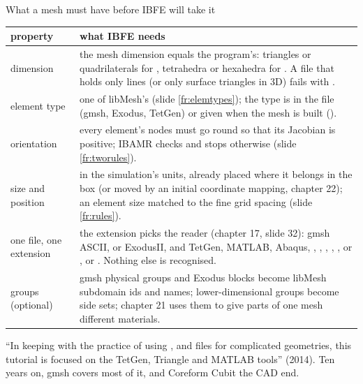 \documentclass[aspectratio=169,11pt]{beamer}
\begin{document}
\begin{frame}{What a mesh must have before IBFE will take it}
\label{fr:musthave}
\scriptsize
\vspace{-6pt}
\begin{tabular}{@{}L{0.20\textwidth}L{0.72\textwidth}@{}}
\toprule
property & what IBFE needs \\
\midrule
dimension & the mesh dimension equals the program's: triangles or quadrilaterals for , tetrahedra or hexahedra for . A file that holds only lines (or only surface triangles in 3D) fails with . \\
element type & one of libMesh's (slide \ref{fr:elemtypes}); the type is in the file (gmsh, Exodus, TetGen) or given when the mesh is built (). \\
orientation & every element's nodes must go round so that its Jacobian is positive; IBAMR checks and stops otherwise (slide \ref{fr:tworules}). \\
size and position & in the simulation's units, already placed where it belongs in the box (or moved by an initial coordinate mapping, chapter 22); an element size matched to the fine grid spacing (slide \ref{fr:rules}). \\
one file, one extension & the extension picks the reader (chapter 17, slide 32):  gmsh ASCII,  or  ExodusII,  and  TetGen,  MATLAB,  Abaqus, , , , , ,  or ,  or . Nothing else is recognised. \\
groups (optional) & gmsh physical groups and Exodus blocks become libMesh subdomain ids and names; lower-dimensional groups become side sets; chapter 21 uses them to give parts of one mesh different materials. \\
\bottomrule
\end{tabular}

\begin{punchbox}
\scriptsize ``In keeping with the practice of using ,  and  files for complicated geometries, this tutorial is focused on the TetGen, Triangle and MATLAB tools'' (2014). Ten years on, gmsh covers most of it, and Coreform Cubit the CAD end.
\end{punchbox}
\end{frame}
\end{document}
